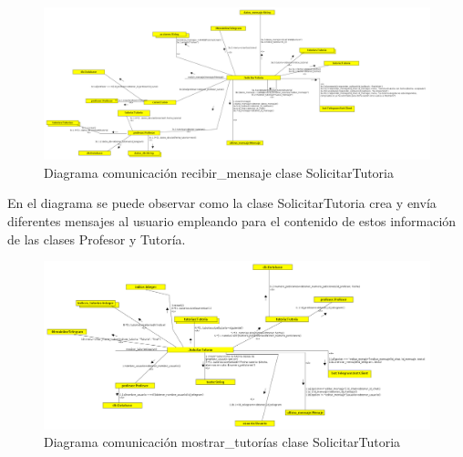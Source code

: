 \begin{figure}[H] %
\centering
\includegraphics[scale=0.18]{imagenes/diagramas/comunicacion/solicitar_tutoria_recibir_mensaje.png}  %

\caption{Diagrama comunicación recibir\_mensaje clase  SolicitarTutoria}\label{figura110}
\end{figure}

En el diagrama se puede observar como la clase SolicitarTutoria crea y envía diferentes mensajes al usuario empleando para el contenido de estos información de las clases Profesor y Tutoría.


\begin{figure}[H] %
\centering
\includegraphics[scale=0.2]{imagenes/diagramas/comunicacion/mostrar_tutorias.png}  %

\caption{Diagrama comunicación mostrar\_tutorías clase  SolicitarTutoria}\label{figura111}
\end{figure}


